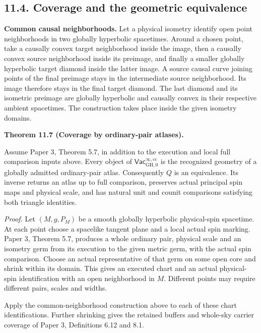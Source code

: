 \documentclass[
  english,
  11pt,
  reqno]{amsart}
\makeatletter
\newcommand{\paperdisplaynext}{%
  \let\paper@savedstartsection\@startsection
  \def\@startsection##1##2##3##4##5##6{%
    \let\@startsection\paper@savedstartsection
    \@tempskipa ##5\relax
    \ifdim\@tempskipa<\z@
      \def\paper@afterskip{.35\baselineskip}%
    \else
      \def\paper@afterskip{##5}%
    \fi
    \@startsection{##1}{##2}{##3}{##4}{\paper@afterskip}{##6}}}
\newcommand{\paperdisplaysection}{\paperdisplaynext\subsection}
\newcommand{\paperleadspace}{%
  \par\if@nobreak\else
    \addpenalty{\@secpenalty}\addvspace{.5\baselineskip}%
  \fi}
\newcommand{\paperleadin}[1]{%
  \ifvmode\paperleadspace\fi
  \textbf{#1}}
\newcommand{\pandocstatementheading}[1]{%
  \par\if@nobreak\else
    \addpenalty{\@beginparpenalty}%
    \addvspace{.5\baselineskip plus .2\baselineskip minus .2\baselineskip}%
  \fi
  {\normalfont\bfseries #1\par}%
  \nobreak\@afterindenttrue\@afterheading
}
\makeatother
\begin{document}
\protect{}\label{sec:ordinary-atlas-coverage}

\paperdisplaysection{11.4. Coverage and the geometric
equivalence}\label{coverage-and-the-geometric-equivalence}

\paperleadin{Common causal neighborhoods.} Let a physical isometry identify
open point neighborhoods in two globally hyperbolic spacetimes. Around a
chosen point, take a causally convex target neighborhood inside the
image, then a causally convex source neighborhood inside its preimage,
and finally a smaller globally hyperbolic target diamond inside the
latter image. A source causal curve joining points of the final preimage
stays in the intermediate source neighborhood. Its image therefore stays
in the final target diamond. The last diamond and its isometric preimage
are globally hyperbolic and causally convex in their respective ambient
spacetimes. The construction takes place inside the given isometry
domains.

\pandocstatementheading{\protect{}\label{thm:ordinary-atlas-geometric-equivalence}Theorem 11.7 (Coverage by ordinary-pair atlases).}

Assume Paper 3, Theorem 5.7, in addition to the execution and local full
comparison inputs above. Every object of
\(\mathsf{Vac}^{\infty,\mathrm{cc}}_{\mathrm{GH},0}\) is the recognized
geometry of a globally admitted ordinary-pair atlas. Consequently \(Q\)
is an equivalence. Its inverse returns an atlas up to full comparison,
preserves actual principal spin maps and physical scale, and has natural
unit and counit comparisons satisfying both triangle identities.

\emph{Proof.} Let \((M,g,P_M)\) be a smooth globally hyperbolic
physical-spin spacetime. At each point choose a spacelike tangent plane
and a local actual spin marking. Paper 3, Theorem 5.7, produces a whole
ordinary pair, physical scale and an isometry germ from its execution to
the given metric germ, with the actual spin comparison. Choose an actual
representative of that germ on some open core and shrink within its
domain. This gives an executed chart and an actual physical-spin
identification with an open neighborhood in \(M\). Different points may
require different pairs, scales and widths.

Apply the common-neighborhood construction above to each of these chart
identifications. Further shrinking gives the retained buffers and
whole-sky carrier coverage of Paper 3, Definitions 6.12 and 8.1.
\end{document}
